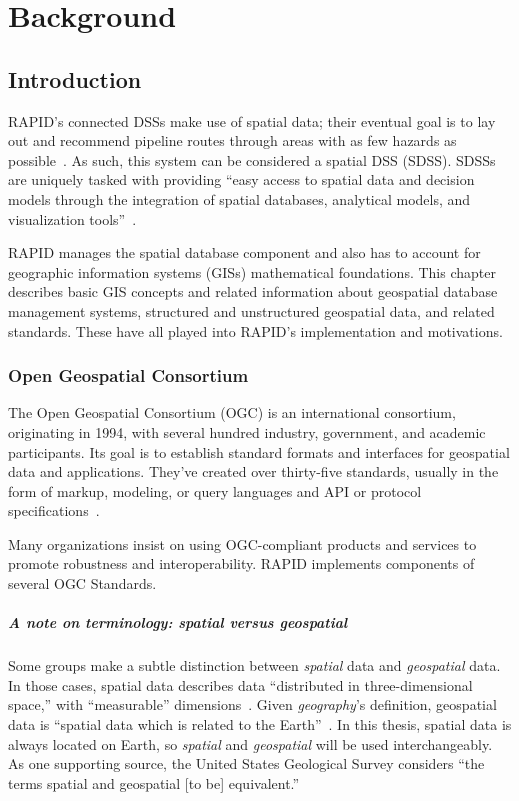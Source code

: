 \chapter{Background}
\label{background}

\section{Introduction}
RAPID's connected DSSs make use of spatial data; their eventual goal is to lay out and recommend pipeline routes through areas with as few hazards as possible~\cite{Dunning2013}. As such, this system can be considered a spatial DSS (SDSS). SDSSs are uniquely tasked with providing ``easy access to spatial data and decision models through the integration of spatial databases, analytical models, and visualization tools''~\cite{RedlandsSDSS}.

RAPID manages the spatial database component and also has to account for geographic information systems (GISs) mathematical foundations. This chapter describes basic GIS concepts and related information about geospatial database management systems, structured and unstructured geospatial data, and related standards. These have all played into RAPID's implementation and motivations.

\subsection{Open Geospatial Consortium}
The Open Geospatial Consortium (OGC) is an international consortium, originating in 1994, with several hundred industry, government, and academic participants. Its goal is to establish standard formats and interfaces for geospatial data and applications. They've created over thirty-five standards, usually in the form of markup, modeling, or query languages and API or protocol specifications~\cite{ogc}.

Many organizations insist on using OGC-compliant products and services to promote robustness and interoperability. RAPID implements components of several OGC Standards.

\paragraph{A note on terminology: \textit{spatial} versus \textit{geospatial}}
Some groups make a subtle distinction between \textit{spatial} data and \textit{geospatial} data. In those cases, spatial data describes data ``distributed in three-dimensional space,'' with ``measurable'' dimensions~\cite{Bhatta2011}. Given \textit{geography}'s definition, geospatial data is ``spatial data which is related to the Earth''~\cite{Bhatta2011}. In this thesis, spatial data is always located on Earth, so \textit{spatial} and \textit{geospatial} will be used interchangeably. As one supporting source, the United States Geological Survey considers ``the terms spatial and geospatial [to be] equivalent.''
\cite{Bhatta2011}

